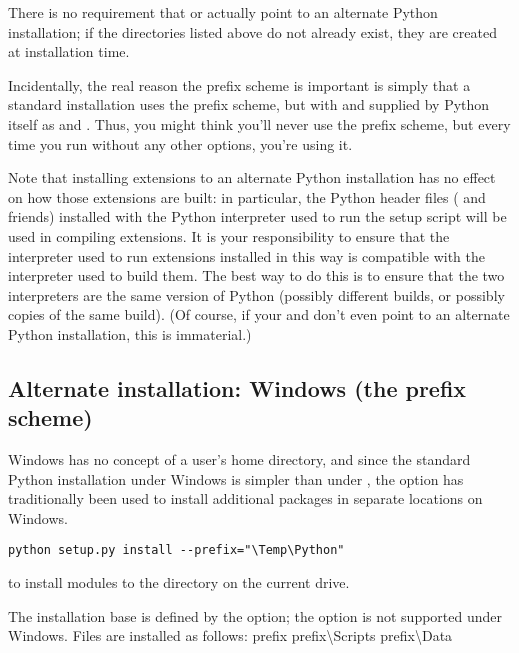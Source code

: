 \documentclass{howto}
\begin{document}
There is no requirement that  or
 actually point to an alternate Python
installation; if the directories listed above do not already exist, they
are created at installation time.

Incidentally, the real reason the prefix scheme is important is simply
that a standard \UNIX{} installation uses the prefix scheme, but with
 and  supplied by
Python itself as  and .  Thus,
you might think you'll never use the prefix scheme, but every time you
run  without any other options, you're
using it.

Note that installing extensions to an alternate Python installation has
no effect on how those extensions are built: in particular, the Python
header files ( and friends) installed with the Python
interpreter used to run the setup script will be used in compiling
extensions.  It is your responsibility to ensure that the interpreter
used to run extensions installed in this way is compatible with the
interpreter used to build them.  The best way to do this is to ensure
that the two interpreters are the same version of Python (possibly
different builds, or possibly copies of the same build).  (Of course, if
your  and  don't even
point to an alternate Python installation, this is immaterial.)


\subsection{Alternate installation: Windows (the prefix scheme)}
\label{alt-install-windows}

Windows has no concept of a user's home directory, and since the
standard Python installation under Windows is simpler than under
\UNIX, the  option has traditionally been used
to install additional packages in separate locations on Windows.

\begin{verbatim}
python setup.py install --prefix="\Temp\Python"
\end{verbatim}

to install modules to the
 directory on the
current drive.

The installation base is defined by the  option;
the  option is not supported under Windows.
Files are installed as follows:
              {prefix}{}
              {prefix}{\textbackslash{}Scripts}
              {prefix}{\textbackslash{}Data}
\end{document}
